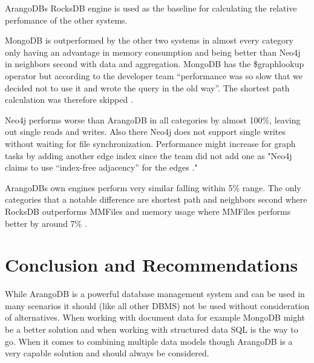 ArangoDBs RocksDB engine is used as the baseline for calculating the relative perfomance of the other systems.

MongoDB is outperformed by the other two systems in almost every category only having an advantage in memory consumption and being better than Neo4j in neighbors second with data and aggregation. MongoDB has the \$graphlookup operator but according to the developer team ``performance was so slow that we decided not to use it and wrote the query in the old way''. The shortest path calculation was therefore skipped \parencite{DBBenchmark}.

Neo4j performs worse than ArangoDB in all categories by almost 100\%, leaving out single reads and writes. Also there Neo4j does not support single writes without waiting for file synchronization. Performance might increase for graph tasks by adding another edge index since the team did not add one as "Neo4j claims to use “index-free adjacency” for the edges \parencite{DBBenchmark}."

ArangoDBs own engines perform very similar falling within 5\% range. The only categories that a notable difference are shortest path and neighbors second where RocksDB outperforms MMFiles and memory usage where MMFiles performs better by around 7\% \parencite{DBBenchmark}.

\section{Conclusion and Recommendations}
While ArangoDB is a powerful database management system and can be used in many scenarios it should (like all other DBMS) not be used without consideration of alternatives. When working with document data for example MongoDB might be a better solution and when working with structured data SQL is the way to go. When it comes to combining multiple data models though ArangoDB is a very capable solution and should always be considered.
